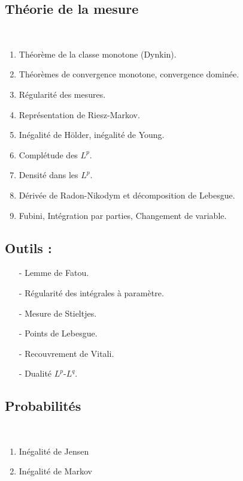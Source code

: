 \documentclass[11pt,a4paper]{article}
\begin{document}
\begin{center}
\section*{Théorie de la mesure} 
\end{center}
~\\
\begin{enumerate}
\item Théorème de la classe monotone (Dynkin).
\item Théorèmes de convergence monotone, convergence dominée.
\item Régularité des mesures.
\item Représentation de Riesz-Markov.
\item Inégalité de Hölder, inégalité de Young.
\item Complétude des $L^p$.
\item Densité dans les $L^p$.
\item Dérivée de Radon-Nikodym et décomposition de Lebesgue.
\item Fubini, Intégration par parties, Changement de variable.
\end{enumerate}


\subsection*{Outils :}
\begin{itemize}
\item[-] Lemme de Fatou.
\item[-] Régularité des intégrales à paramètre.
\item[-] Mesure de Stieltjes.
\item[-] Points de Lebesgue.
\item[-] Recouvrement de Vitali.
\item[-] Dualité $L^p$-$L^q$.
\end{itemize}



\newpage\begin{center}
\section*{Probabilités} 
\end{center}
~\\
\begin{enumerate}
\item Inégalité de Jensen
\item Inégalité de Markov
\end{enumerate}
\end{document}
